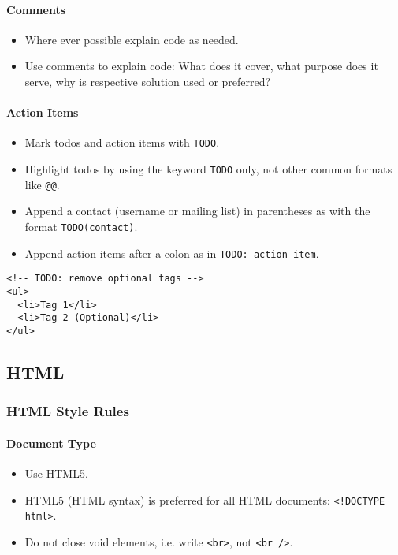 \documentclass[a4paper, 11pt]{article}
\begin{document}
\paragraph{Comments}
\begin{itemize}
\item Where ever possible explain code as needed.
\item Use comments to explain code: What does it cover, what purpose does it serve, why is respective solution used or preferred?
\end{itemize}

\paragraph{Action Items}
\begin{itemize}
\item Mark todos and action items with \texttt{TODO}.
\item Highlight todos by using the keyword \texttt{TODO} only, not other common formats like \texttt{@@}.
\item Append a contact (username or mailing list) in parentheses as with the format \texttt{TODO(contact)}.
\item Append action items after a colon as in \texttt{TODO: action item}.
\end{itemize}
\begin{verbatim}
<!-- TODO: remove optional tags -->
<ul>
  <li>Tag 1</li>
  <li>Tag 2 (Optional)</li>
</ul>
\end{verbatim}

\pagebreak

\subsection{HTML}

\subsubsection{HTML Style Rules}

\paragraph{Document Type}
\begin{itemize}
\item Use HTML5.
\item HTML5 (HTML syntax) is preferred for all HTML documents: \texttt{<!DOCTYPE html>}.
\item Do not close void elements, i.e. write \texttt{<br>}, not \texttt{<br />}.
\end{itemize}
\end{document}
